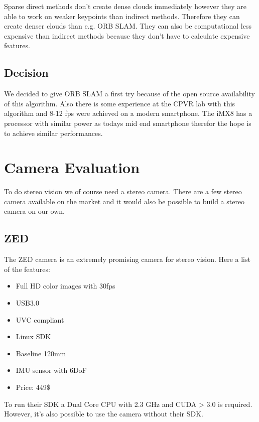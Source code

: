 \documentclass[11pt,a4paper,titlepage,oneside]{report}
\begin{document}
Sparse direct methods don't create dense clouds immediately however they are able to work on weaker keypoints than indirect methods. Therefore they can create denser clouds than e.g. ORB SLAM. They can also be computational less expensive than indirect methods because they don't have to calculate expensive features.

\section{Decision}

We decided to give ORB SLAM a first try because of the open source availability of this algorithm. Also there is some experience at the CPVR lab with this algorithm and 8-12 fps were achieved on a modern smartphone. The iMX8 has a processor with similar power as todays mid end smartphone therefor the hope is to achieve similar performances.

\chapter{Camera Evaluation}

To do stereo vision we of course need a stereo camera. There are a few stereo camera available on the market and it would also be possible to build a stereo camera on our own.

\section{ZED}
The ZED camera is an extremely promising camera for stereo vision. Here a list of the features:
\begin{itemize}
	\item Full HD color images with 30fps
	\item USB3.0
	\item UVC compliant
	\item Linux SDK
	\item Baseline 120mm
	\item IMU sensor with 6DoF
	\item Price: 449\$
\end{itemize}

To run their SDK a Dual Core CPU with 2.3 GHz and CUDA > 3.0 is required. However, it's also possible to use the camera without their SDK.
\end{document}

